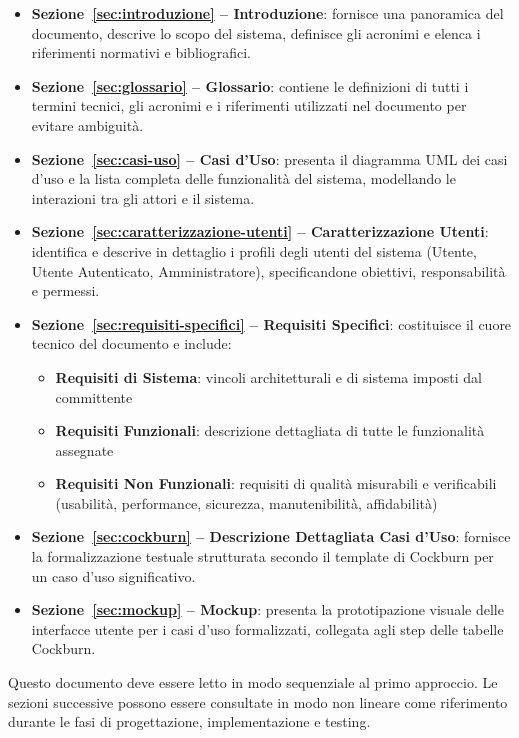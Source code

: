 \begin{itemize}[leftmargin=1.1em]
\item \textbf{Sezione~\ref{sec:introduzione} -- Introduzione}: fornisce una panoramica del documento, descrive lo scopo del sistema, definisce gli acronimi e elenca i riferimenti normativi e bibliografici.

\item \textbf{Sezione~\ref{sec:glossario} -- Glossario}: contiene le definizioni di tutti i termini tecnici, gli acronimi e i riferimenti utilizzati nel documento per evitare ambiguità.

\item \textbf{Sezione~\ref{sec:casi-uso} -- Casi d'Uso}: presenta il diagramma UML dei casi d'uso e la lista completa delle funzionalità del sistema, modellando le interazioni tra gli attori e il sistema.

\item \textbf{Sezione~\ref{sec:caratterizzazione-utenti} -- Caratterizzazione Utenti}: identifica e descrive in dettaglio i profili degli utenti del sistema (Utente, Utente Autenticato, Amministratore), specificandone obiettivi, responsabilità e permessi.

\item \textbf{Sezione~\ref{sec:requisiti-specifici} -- Requisiti Specifici}: costituisce il cuore tecnico del documento e include:
  \begin{itemize}
  \item \textbf{Requisiti di Sistema}: vincoli architetturali e di sistema imposti dal committente
  \item \textbf{Requisiti Funzionali}: descrizione dettagliata di tutte le funzionalità assegnate
  \item \textbf{Requisiti Non Funzionali}: requisiti di qualità misurabili e verificabili (usabilità, performance, sicurezza, manutenibilità, affidabilità)
  \end{itemize}

\item \textbf{Sezione~\ref{sec:cockburn} -- Descrizione Dettagliata Casi d'Uso}: fornisce la formalizzazione testuale strutturata secondo il template di Cockburn per un caso d'uso significativo.

\item \textbf{Sezione~\ref{sec:mockup} -- Mockup}: presenta la prototipazione visuale delle interfacce utente per i casi d'uso formalizzati, collegata agli step delle tabelle Cockburn.
\end{itemize}

Questo documento deve essere letto in modo sequenziale al primo approccio. Le sezioni successive possono essere consultate in modo non lineare come riferimento durante le fasi di progettazione, implementazione e testing.

\newpage